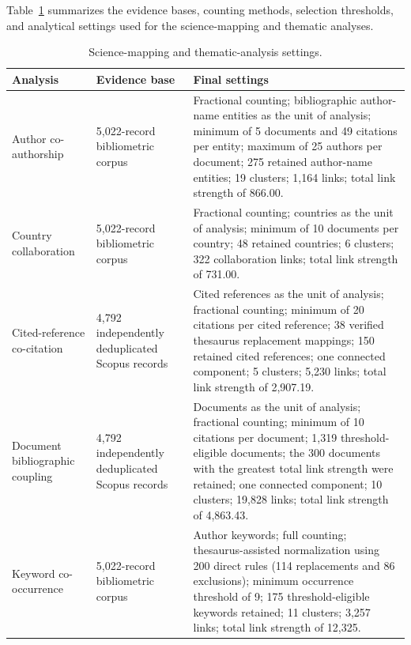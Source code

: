 \documentclass[pdflatex,sn-mathphys-num]{sn-jnl}%
\theoremstyle{thmstyleone}%
\theoremstyle{thmstyletwo}%
\theoremstyle{thmstylethree}%
\begin{document}
Table~\ref{tab:mapping-settings} summarizes the evidence
bases, counting methods, selection thresholds, and analytical
settings used for the science-mapping and thematic analyses.
\begin{table}[!t]
\centering
\caption{Science-mapping and thematic-analysis settings.}
\label{tab:mapping-settings}

\scriptsize
\setlength{\tabcolsep}{3pt}
\renewcommand{\arraystretch}{1.15}

\begin{tabular}{@{}p{2.8cm}p{2.8cm}p{9.0cm}@{}}
\toprule
Analysis
& Evidence base
& Final settings \\
\midrule

Author co-authorship
& 5,022-record bibliometric corpus
& Fractional counting; bibliographic author-name entities as the
unit of analysis; minimum of 5 documents and 49 citations per
entity; maximum of 25 authors per document; 275 retained
author-name entities; 19 clusters; 1,164 links; total link strength
of 866.00. \\

Country collaboration
& 5,022-record bibliometric corpus
& Fractional counting; countries as the unit of analysis; minimum
of 10 documents per country; 48 retained countries; 6 clusters;
322 collaboration links; total link strength of 731.00. \\

Cited-reference co-citation
& 4,792 independently deduplicated Scopus records
& Cited references as the unit of analysis; fractional counting;
minimum of 20 citations per cited reference; 38 verified thesaurus
replacement mappings; 150 retained cited references; one connected
component; 5 clusters; 5,230 links; total link strength of
2,907.19. \\

Document bibliographic coupling
& 4,792 independently deduplicated Scopus records
& Documents as the unit of analysis; fractional counting; minimum
of 10 citations per document; 1,319 threshold-eligible documents;
the 300 documents with the greatest total link strength were
retained; one connected component; 10 clusters; 19,828 links;
total link strength of 4,863.43. \\

Keyword co-occurrence
& 5,022-record bibliometric corpus
& Author keywords; full counting; thesaurus-assisted normalization
using 200 direct rules (114 replacements and 86 exclusions);
minimum occurrence threshold of 9; 175 threshold-eligible keywords
retained; 11 clusters; 3,257 links; total link strength of 12,325. \\


\end{tabular}
\end{table}
\end{document}
